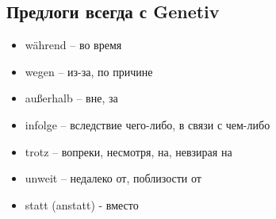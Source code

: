 \subsection{Предлоги всегда с Genetiv}

\begin{itemize}
\item während -- во время
\item wegen -- из-за, по причине
\item außerhalb -- вне, за
\item infolge -- вследствие чего-либо, в связи с чем-либо
\item trotz -- вопреки, несмотря, на, невзирая на
\item unweit -- недалеко от, поблизости от
\item statt (anstatt) - вместо
\end{itemize}


